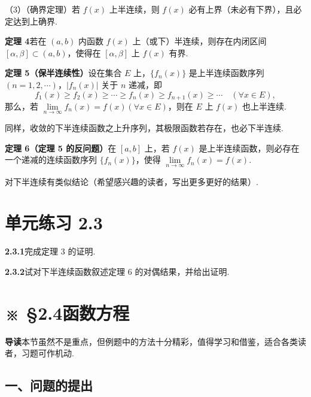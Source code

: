 \documentclass[UTF8, 12pt, fontset=fandol, oneside]{ctexart}
\begin{document}
（3）（确界定理）若 $f(x)$ 上半连续，则 $f(x)$ 必有上界（未必有下界），且必定达到上确界.

\noindent\textbf{定理 4}\quad 若在 $(a,b)$ 内函数 $f(x)$ 上（或下）半连续，则存在内闭区间 $[\alpha,\beta]\subset(a,b)$，使得在 $[\alpha,\beta]$ 上 $f(x)$ 有界.

\noindent\textbf{定理 5（保半连续性）}\quad 设在集合 $E$ 上，$\{f_n(x)\}$ 是上半连续函数序列 $(n=1,2,\cdots)$，$|f_n(x)|$ 关于 $n$ 递减，即
\[
  f_1(x)\ge f_2(x)\ge\cdots\ge f_n(x)\ge f_{n+1}(x)\ge\cdots\quad(\forall x\in E),
\]
那么，若 $\lim\limits_{n\to\infty}f_n(x)=f(x)(\forall x\in E)$，则在 $E$ 上 $f(x)$ 也上半连续.

同样，收敛的下半连续函数之上升序列，其极限函数若存在，也必下半连续.

\noindent\textbf{定理 6（定理 5 的反问题）}\quad 在 $[a,b]$ 上，若 $f(x)$ 是上半连续函数，则必存在一个递减的连续函数序列 $\{f_n(x)\}$，使得 $\lim\limits_{n\to\infty}f_n(x)=f(x)$.

对下半连续有类似结论（希望感兴趣的读者，写出更多更好的结果）.

\section*{单元练习 2.3}

\noindent\textbf{2.3.1}\quad 完成定理 3 的证明.

\noindent\textbf{2.3.2}\quad 试对下半连续函数叙述定理 6 的对偶结果，并给出证明.

\section*{※ §2.4\quad 函数方程}

\noindent\textbf{导读}\quad 本节虽然不是重点，但例题中的方法十分精彩，值得学习和借鉴，适合各类读者，习题可作机动.

\subsection*{一、问题的提出}
\end{document}
